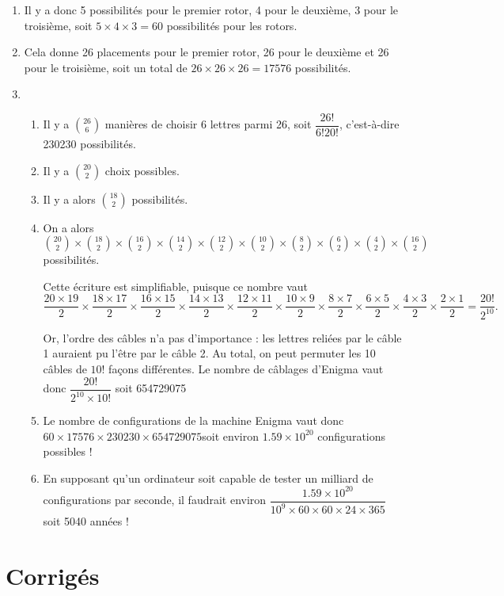 \documentclass[11pt,fleqn, openany]{book} %
\begin{document}
\begin{solution}\hspace{0pt}
\begin{enumerate}
\item  Il y a donc 5 possibilités pour le premier rotor, 4 pour le deuxième, 3 pour le troisième, soit $5\times 4 \times 3 = 60$ possibilités pour les rotors.

\item Cela donne 26 placements pour le premier rotor, 26 pour le deuxième et 26 pour le troisième, soit un total de $26 \times 26 \times 26 = 17576$ possibilités.
\item 
\begin{enumerate}
\item Il y a $\binom{26}{6}$ manières de choisir 6 lettres parmi 26, soit $\dfrac{26!}{6!	20!}$, c'est-à-dire 230230 possibilités.
\item Il y a $\binom{20}{2}$ choix possibles.
\item Il y a alors $\binom{18}{2}$ possibilités.

\item 
On a alors $\binom{20}{2} \times \binom{18}{2} \times \binom{16}{2}\times \binom{14}{2}\times \binom{12}{2}\times \binom{10}{2}\times \binom{8}{2}\times \binom{6}{2}\times \binom{4}{2}\times \binom{16}{2}$ possibilités.

Cette écriture est simplifiable, puisque ce nombre vaut
\[\dfrac{20 \times 19}{2} \times \dfrac{18 \times 17}{2} \times \dfrac{16 \times 15}{2} \times \dfrac{14 \times 13}{2} \times \dfrac{12 \times 11}{2} \times \dfrac{10 \times 9}{2} \times \dfrac{8 \times 7}{2} \times \dfrac{6 \times 5}{2} \times \dfrac{4 \times 3}{2} \times \dfrac{2 \times 1}{2} = \dfrac{20!}{2^{10}}.\] 

Or, l'ordre des câbles n'a pas d'importance : les lettres reliées par le câble 1 auraient pu l'être par le câble 2. Au total, on peut permuter les 10 câbles de $10!$ façons différentes. Le nombre de câblages d'Enigma vaut donc $\dfrac{20!}{2^{10} \times 10!}$ soit 654729075
\item Le nombre de configurations de la machine Enigma vaut donc $60 \times 17576 \times 230230 \times 654729075$soit environ $1.59 \times 10^{20}$ configurations possibles !

\item En supposant qu'un ordinateur soit capable de tester un milliard de configurations par seconde, il faudrait environ $\dfrac{1.59 \times 10^{20}}{10^9 \times 60 \times 60 \times 24 \times 365}$ soit 5040 années !

\end{enumerate}
\end{enumerate}
\end{solution}



\chapter{Corrigés}


\printsolutions[headings={false} ]
\end{document}

